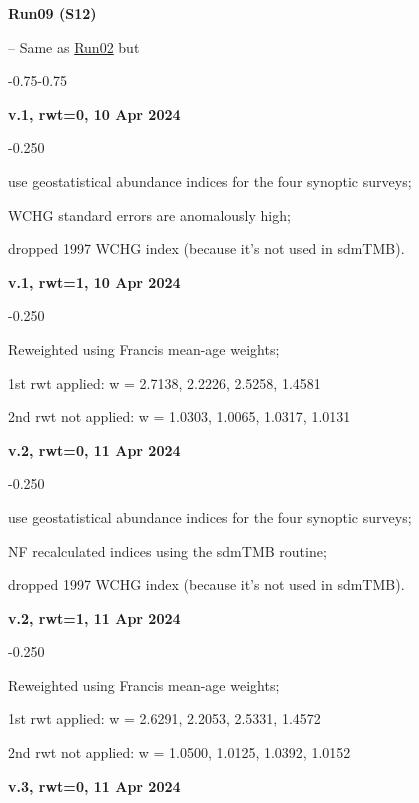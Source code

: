 \hypertarget{R09}{\textbf{Run09 (S12)}} -- Same as \hyperlink{R02}{Run02} but
\begin{itemize_csas}{-0.75}{-0.75}
	\item \textbf{v.1, rwt=0, 10 Apr 2024}
	\begin{itemize_csas}{-0.25}{0}
		\item use geostatistical abundance indices for the four synoptic surveys;
		\item WCHG standard errors are anomalously high;
		\item dropped 1997 WCHG index (because it's not used in sdmTMB).
	\end{itemize_csas}
	\item \textbf{v.1, rwt=1, 10 Apr 2024}
	\begin{itemize_csas}{-0.25}{0}
		\item Reweighted using Francis mean-age weights;
		\item 1st rwt applied: w = 2.7138, 2.2226, 2.5258, 1.4581
		\item 2nd rwt not applied: w = 1.0303, 1.0065, 1.0317, 1.0131
	\end{itemize_csas}
	\item \textbf{v.2, rwt=0, 11 Apr 2024}
	\begin{itemize_csas}{-0.25}{0}
		\item use geostatistical abundance indices for the four synoptic surveys;
		\item NF recalculated indices using the sdmTMB routine;
		\item dropped 1997 WCHG index (because it's not used in sdmTMB).
	\end{itemize_csas}
	\item \textbf{v.2, rwt=1, 11 Apr 2024}
	\begin{itemize_csas}{-0.25}{0}
		\item Reweighted using Francis mean-age weights;
		\item 1st rwt applied: w = 2.6291, 2.2053, 2.5331, 1.4572
		\item 2nd rwt not applied: w = 1.0500, 1.0125, 1.0392, 1.0152
	\end{itemize_csas}
	\item \textbf{v.3, rwt=0, 11 Apr 2024}

\end{itemize_csas}
